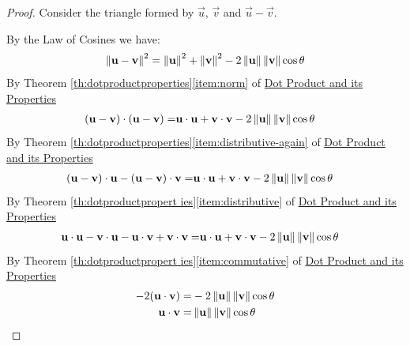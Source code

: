 \documentclass{ximera}
\begin{document}
\begin{proof} Consider the triangle formed by $\vec{u}$, $\vec{v}$ and $\vec{u}-\vec{v}$. 

\begin{center}
\end{center}

By the Law of Cosines we have:
\begin{align*}
\left\lVert\mathbf{u}-\mathbf{v}\right\rVert^2=\left\lVert\mathbf{u}\right\rVert^2+\left\lVert\mathbf{v}\right\rVert^2-2\left\lVert\mathbf{u}\right\rVert\left\lVert\mathbf{v}\right\rVert\cos\theta
\end{align*}
By Theorem \ref{th:dotproductproperties}\ref{item:norm} of \href{\xmbaseurl/VEC-0050/main}{Dot Product and its Properties}
\begin{align*}
(\mathbf{u}-\mathbf{v})\cdot (\mathbf{u}-\mathbf{v})=&\mathbf{u}\cdot \mathbf{u}+\mathbf{v}\cdot \mathbf{v}-2\left\lVert\mathbf{u}\right\rVert\left\lVert\mathbf{v}\right\rVert\cos\theta
\end{align*}
By Theorem \ref{th:dotproductproperties}\ref{item:distributive-again} of \href{\xmbaseurl/VEC-0050/main}{Dot Product and its Properties}
\begin{align*}
(\mathbf{u}-\mathbf{v})\cdot \mathbf{u}-(\mathbf{u}-\mathbf{v})\cdot \mathbf{v}=&\mathbf{u}\cdot \mathbf{u}+\mathbf{v}\cdot \mathbf{v}-2\left\lVert\mathbf{u}\right\rVert\left\lVert\mathbf{v}\right\rVert\cos\theta
\end{align*}
By Theorem \ref{th:dotproductpropert ies}\ref{item:distributive} of \href{\xmbaseurl/VEC-0050/main}{Dot Product and its Properties}
\begin{align*}
\mathbf{u}\cdot \mathbf{u}-\mathbf{v}\cdot\mathbf{u}-\mathbf{u}\cdot\mathbf{v}+\mathbf{v}\cdot \mathbf{v}=&\mathbf{u}\cdot \mathbf{u}+\mathbf{v}\cdot \mathbf{v}-2\left\lVert\mathbf{u}\right\rVert\left\lVert\mathbf{v}\right\rVert\cos\theta
\end{align*}
By Theorem \ref{th:dotproductpropert ies}\ref{item:commutative} of \href{\xmbaseurl/VEC-0050/main}{Dot Product and its Properties}
\begin{align*}
-2(\mathbf{u}\cdot \mathbf{v})=&-2\left\lVert\mathbf{u}\right\rVert\left\lVert\mathbf{v}\right\rVert\cos\theta\\
\mathbf{u}\cdot \mathbf{v}=&\left\lVert\mathbf{u}\right\rVert\left\lVert\mathbf{v}\right\rVert\cos\theta
\end{align*}
\end{proof}
\end{document}
